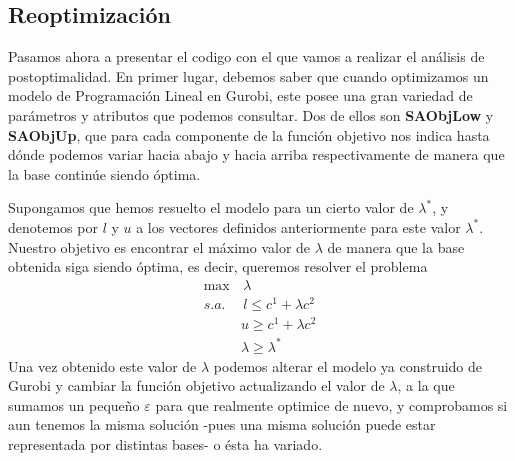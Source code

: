 \documentclass[twoside,a4paper,openright,12pt,tikz]{book}
\begin{document}
\subsection{Reoptimización}
Pasamos ahora a presentar el codigo con el que vamos a realizar el análisis de postoptimalidad. En primer lugar, debemos saber que cuando optimizamos un modelo de Programación Lineal en Gurobi, este posee una gran variedad de parámetros y atributos que podemos consultar. Dos de ellos son \textbf{SAObjLow }y \textbf{SAObjUp}, que para cada componente de la función objetivo nos indica hasta dónde podemos variar hacia abajo y hacia arriba respectivamente de manera que la base continúe siendo óptima. 

 Supongamos que hemos resuelto el modelo para un cierto valor de $\lambda^*$, y denotemos por $l$ y $u$ a los vectores definidos anteriormente para este valor $\lambda^*$. Nuestro objetivo es encontrar el máximo valor de $\lambda$ de manera que la base obtenida siga siendo óptima, es decir, queremos resolver el problema
\begin{align*}
\max&\, \lambda\\
s.a.&\,  l \leq c^1 + \lambda c^2\\
& u \geq c^1 + \lambda c^2 \\
& \lambda\geq \lambda^* 
\end{align*}
Una vez obtenido este valor de $\lambda$ podemos alterar el modelo ya construido de Gurobi y cambiar la función objetivo actualizando el valor de $\lambda$, a la que sumamos un pequeño $\varepsilon$ para que realmente optimice de nuevo, y comprobamos si aun tenemos la misma solución -pues una misma solución puede estar representada por distintas bases- o ésta ha variado. 
\end{document}
